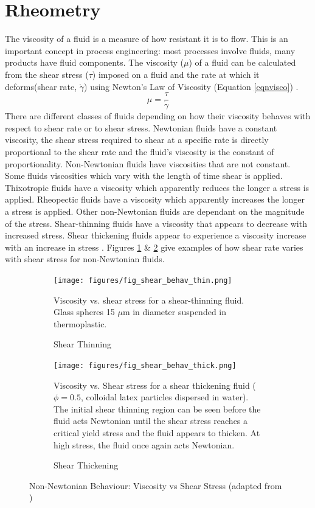 \documentclass[twoside,a4]{report}
\def\br{\newline \newline \noindent}
\begin{document}
	\section*{Rheometry}
	The viscosity of a fluid is a measure of how resistant it is to flow. This is an important concept in process engineering: most processes involve fluids, many products have fluid components. The viscosity (\(\mu\)) of a fluid can be calculated from the shear stress (\(\tau\)) imposed on a fluid and the rate at which it deforms(shear rate, \(\dot{\gamma}\)) using Newton's Law of Viscosity (Equation \ref{eqnvisco}) \cite{backfluidmech}.
	\begin{equation}
	\mu = \frac{\tau}{\dot{\gamma}}
	\label{eqnvisco}
	\end{equation}
	There are different classes of fluids depending on how their viscosity behaves with respect to shear rate or to shear stress. Newtonian fluids have a constant viscosity, the shear stress required to shear at a specific rate is directly proportional to the shear rate and the fluid's viscosity is the constant of proportionality. Non-Newtonian fluids have viscosities that are not constant. Some fluids viscosities which vary with the length of time shear is applied. Thixotropic fluids have a viscosity which apparently reduces the longer a stress is applied. Rheopectic fluids have a viscosity which apparently increases the longer a stress is applied. Other non-Newtonian fluids are dependant on the magnitude of the stress. Shear-thinning fluids have a viscosity that appears to decrease with increased stress. Shear thickening fluids appear to experience a viscosity increase with an increase in stress \cite{backtypesofnonnewt}. Figures \ref{figshearthin} \& \ref{figshearthick} give examples of how shear rate varies with shear stress for non-Newtonian fluids. 
	\br
	\begin{figure}[!htb]
		\centering
		\begin{subfigure}[t]{0.45\textwidth}
			\centering
			\texttt{[image: figures/fig\_shear\_behav\_thin.png]}
			\caption{Shear Thinning}
			\label{figshearthin}
			\footnotesize 
			Viscosity vs. shear stress for a shear-thinning fluid. Glass spheres 15 $\mu$m in diameter suspended in thermoplastic.
		\end{subfigure}
		\begin{subfigure}[t]{0.45\textwidth}
			\centering
			\texttt{[image: figures/fig\_shear\_behav\_thick.png]}
			\caption{Shear Thickening}
			\label{figshearthick}
			\footnotesize 
			Viscosity vs. Shear stress for a shear thickening fluid ($\phi=0.5$, colloidal latex particles dispersed in water). The initial shear thinning region can be seen before the fluid acts Newtonian until the shear stress reaches a critical yield stress and the fluid appears to thicken. At high stress, the fluid once again acts Newtonian.
		\end{subfigure}
		\label{figshearthinthick}
		\caption{Non-Newtonian Behaviour: Viscosity vs Shear Stress (adapted from \cite{figshearthin, figshearthick})}
	\end{figure}
	
\end{document}
